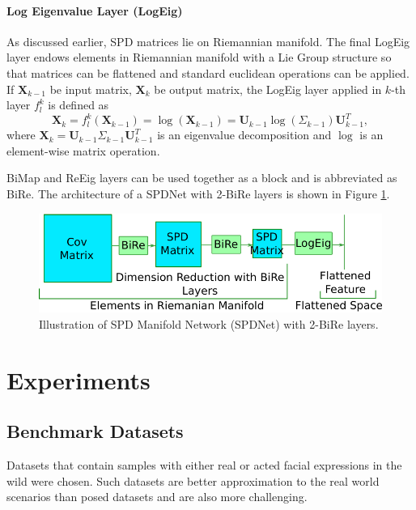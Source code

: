 \documentclass[10pt,twocolumn,letterpaper]{article}
\begin{document}
		\paragraph{Log Eigenvalue Layer (LogEig)}
		As discussed earlier, SPD matrices lie on Riemannian manifold. The final LogEig layer endows elements in Riemannian manifold with a Lie Group structure so that matrices can be flattened and standard euclidean operations can be applied. If $\mathbf{X}_{k-1}$ be input matrix, $\mathbf{X}_k$ be output matrix, the LogEig layer applied in $k$-th layer $f_l^k$ is defined as 
		\begin{equation}
		    \mathbf{X}_k = f^{k}_l(\mathbf{X}_{k-1})=\log(\mathbf{X}_{k-1}) = \mathbf{U}_{k-1}\log(\Sigma_{k-1})\mathbf{U}_{k-1}^T,
		\end{equation}
		where $\mathbf{X}_k=\mathbf{U}_{k-1}\Sigma_{k-1}\mathbf{U}_{k-1}^T$ is an eigenvalue decomposition and $\log$ is an element-wise matrix operation.
		
		BiMap and ReEig layers can be used together as a block and is abbreviated as BiRe. The architecture of a SPDNet with 2-BiRe layers is shown in Figure \ref{fig:spdnetconcept}. 
		
		
		\begin{figure}
		\begin{center}
				\includegraphics[width=.95\linewidth,keepaspectratio]{res/spdnetconcept}
		\end{center}
		\caption{Illustration of SPD Manifold Network (SPDNet) with 2-BiRe layers.}
		\label{fig:spdnetconcept}
	\end{figure}	
\section{Experiments}
	\subsection{Benchmark Datasets}
Datasets that contain samples with either real or acted facial expressions in the wild were chosen. Such datasets are better approximation to the real world scenarios than posed datasets and are also more challenging.
\end{document}

